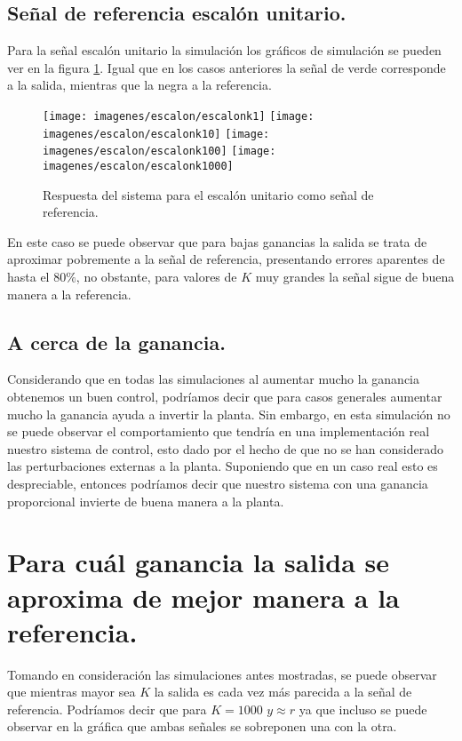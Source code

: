 \documentclass[11pt,a4paper]{article}
\begin{document}
\subsection{Señal de referencia escalón unitario.}

Para la señal escalón unitario la simulación los gráficos de simulación se pueden ver en la figura \ref{fig:esc}. Igual que en los casos anteriores la señal de verde corresponde a la salida, mientras que la negra a la referencia.

\begin{figure}[!ht]
\centering
\texttt{[image: imagenes/escalon/escalonk1]}
\texttt{[image: imagenes/escalon/escalonk10]}
\texttt{[image: imagenes/escalon/escalonk100]}
\texttt{[image: imagenes/escalon/escalonk1000]}
\caption{Respuesta del sistema para el escalón unitario como señal de referencia.}
\label{fig:esc}
\end{figure}

En este caso se puede observar que para bajas ganancias la salida se trata de aproximar pobremente a la señal de referencia, presentando errores aparentes de hasta el $80\%$, no obstante, para valores de $K$ muy grandes la señal sigue de buena manera a la referencia.

\subsection{A cerca de la ganancia.}

Considerando que en todas las simulaciones al aumentar mucho la ganancia obtenemos un buen control, podríamos decir que para casos generales aumentar mucho la ganancia ayuda a invertir la planta. Sin embargo, en esta simulación no se puede observar el comportamiento que tendría en una implementación real nuestro sistema de control, esto dado por el hecho de que no se han considerado las perturbaciones externas a la planta. Suponiendo que en un caso real esto es despreciable, entonces podríamos decir que nuestro sistema con una ganancia proporcional invierte de buena manera a la planta.

\section{Para cuál ganancia la salida se aproxima de mejor manera a la referencia.}

Tomando en consideración las simulaciones antes mostradas, se puede observar que mientras mayor sea $K$ la salida es cada vez más parecida a la señal de referencia. Podríamos decir que para $K = 1000$ $y \approx r$ ya que incluso se puede observar en la gráfica que ambas señales se sobreponen una con la otra.
\end{document}
